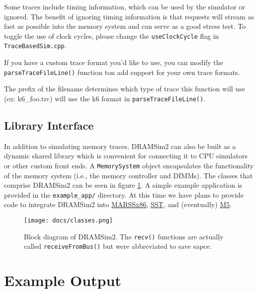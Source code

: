 \documentclass[11pt]{article}
\begin{document}
\begin{minipage}{\textwidth}
\begin{lstlisting}
\end{lstlisting}

  Some traces include timing information, which can be used
  by the simulator or ignored. The benefit of ignoring timing information is that requests
  will stream as fast as possible into the memory system and can serve as a good stress
  test. To toggle the use of clock cycles, please change the \texttt{useClockCycle} flag in \texttt{TraceBasedSim.cpp}.

  If you have a custom trace format you'd like to use, you can modify the \texttt{parseTraceFileLine()} function ton add
  support for your own trace formats. 

  The prefix of the filename determines which type of trace this function will use (ex: k6\_foo.trc) will use the k6 format 
  in \texttt{parseTraceFileLine()}.
\end{minipage}

\subsection{Library Interface}\label{library}
In addition to simulating memory traces, DRAMSim2 can also be built as a dynamic
shared library which is convenient for connecting it to CPU simulators or other
custom front ends.  A \texttt{MemorySystem} object encapsulates the
functionality of the memory system (i.e., the memory controller and DIMMs). The 
classes that comprise DRAMSim2 can be seen in figure \ref{classes}. A
simple example application is provided in the \texttt{example\_app/} directory.
At this time we have plans to provide code to integrate DRAMSim2 into 
\href{http://www.marss86.org/index.php/Home}{MARSSx86},
\href{http://www.cs.sandia.gov/sst/}{SST}, and (eventually)
\href{http://www.m5sim.org/}{M5}.

\begin{figure}[h]
\begin{center}
\texttt{[image: docs/classes.png]}
\caption{Block diagram of DRAMSim2. The \texttt{\footnotesize recv()} functions are actually called
\texttt{\footnotesize receiveFromBus()} but were abbreviated to save sapce.}
\label{classes}
\end{center}
\end{figure}

\section{Example Output}
\end{document}
